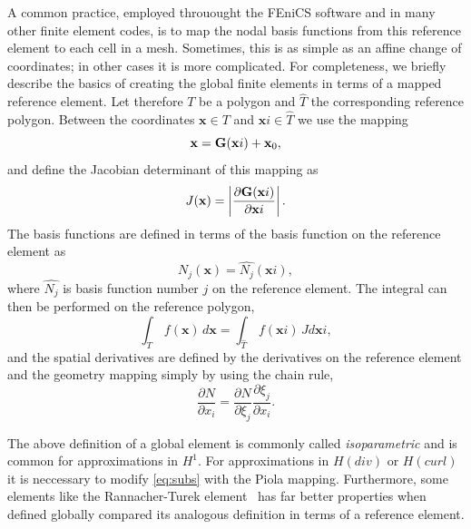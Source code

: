 A common practice, employed throuought the FEniCS
software and in many other finite element codes, is to map the nodal
basis functions from this reference element to each cell in a mesh.
Sometimes, this is as simple as an affine change of coordinates; in
other cases it is more complicated.
For completeness, we briefly describe the basics of creating the global finite elements in terms of a mapped
reference element. Let therefore $T$ be a polygon and $\hat{T}$ the corresponding reference polygon.
Between the coordinates
$\mathbf{x}\in T$ and $\mathbf{x}i\in\hat T$ we use the mapping 
\begin{equation}
\label{eq:geometry}
\mathbf{x} = \mathbf{G}(\mathbf{x}i) + \mathbf{x}_0,
\end{equation}
and define the Jacobian determinant of this mapping as
\begin{equation}
\label{eq:geometry2}
J(\mathbf{x}) = \left| \frac{\partial\mathbf{G}(\mathbf{x}i) }{\partial \mathbf{x}i} \right| .
\end{equation}
The basis functions are defined in terms of the basis function
on the reference element as
\begin{equation}
\label{eq:subs}
N_j(\mathbf{x}) = \hat{N_j}(\mathbf{x}i), 
\end{equation}
where $\hat{N_j}$ is basis function number $j$ on the reference element. 
The integral can then be performed on the reference polygon, 
\begin{equation}
\label{eq:integration2}
\int_T \, f(\mathbf{x}) \, d\mathbf{x} = \int_{\hat{T}} \, f(\mathbf{x}i) \, J d\mathbf{x}i ,
\end{equation}
and the spatial derivatives are defined by the derivatives on the
reference element and the geometry mapping simply by using the
chain rule, 
\begin{equation}
\label{eq:chain}
\frac{\partial N}{\partial x_i} = 
\frac{\partial N}{\partial \xi_j} \frac{\partial \xi_j }{\partial x_i }  .
\end{equation}

The above definition of a global element is commonly called \emph{isoparametric}
and is common for approximations in $H^1$. For approximations in $H(div)$ or
$H(curl)$ it is neccessary to modify \eqref{eq:subs} with the Piola mapping.  
Furthermore, some elements like the Rannacher-Turek element~\cite{Turek99,RannacherTurek92} has far better
properties when defined globally compared its analogous definition in terms
of a reference element. 


